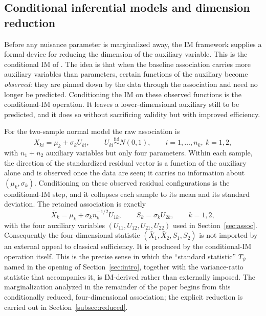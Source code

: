 \documentclass[12pt]{article}
\begin{document}
\subsection{Conditional inferential models and dimension reduction}
\label{subsec:cim}

Before any nuisance parameter is marginalized away, the IM framework supplies a
formal device for reducing the dimension of the auxiliary variable.  This is the
conditional IM of \citet{MartinLiu2015Conditional}.  The idea is that when the
baseline association carries more auxiliary variables than parameters, certain
functions of the auxiliary become \emph{observed}: they are pinned down by the
data through the association and need no longer be predicted.  Conditioning the
IM on these observed functions is the conditional-IM operation.  It leaves a
lower-dimensional auxiliary still to be predicted, and it does so without
sacrificing validity but with improved efficiency.

For the two-sample normal model the raw association is
\[
X_{ki}=\mu_k+\sigma_k U_{ki},
\qquad U_{ki}\overset{\text{iid}}{\sim}N(0,1),
\qquad i=1,\ldots,n_k,\ k=1,2,
\]
with \(n_1+n_2\) auxiliary variables but only four parameters.  Within each
sample, the direction of the standardized residual vector is a function of the
auxiliary alone and is observed once the data are seen; it carries no
information about \((\mu_k,\sigma_k)\).  Conditioning on these observed residual
configurations is the conditional-IM step, and it collapses each sample to its
mean and its standard deviation.  The retained association is exactly
\begin{equation}
\label{eq:retained-assoc}
\bar X_k=\mu_k+\sigma_k n_k^{-1/2}U_{1k},
\qquad
S_k=\sigma_k U_{2k},
\qquad k=1,2,
\end{equation}
with the four auxiliary variables \((U_{11},U_{12},U_{21},U_{22})\) used in
Section~\ref{sec:assoc}.  Consequently the four-dimensional statistic
\((\bar X_1,\bar X_2,S_1,S_2)\) is not imported by an external appeal to
classical sufficiency.  It is produced by the conditional-IM operation itself.
This is the precise sense in which the ``standard statistic'' \(T_\psi\) named in
the opening of Section~\ref{sec:intro}, together with the variance-ratio
statistic that accompanies it, is IM-derived rather than externally imposed.  The
marginalization analyzed in the remainder of the paper begins from this
conditionally reduced, four-dimensional association; the explicit reduction is
carried out in Section~\ref{subsec:reduced}.
\end{document}
